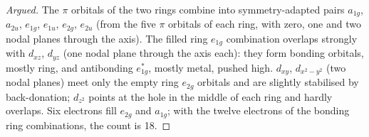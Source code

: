 \begin{proof}[Argued]
The $\pi$ orbitals of the two rings combine into symmetry-adapted pairs $a_{1g}$, $a_{2u}$,
$e_{1g}$, $e_{1u}$, $e_{2g}$, $e_{2u}$ (from the five $\pi$ orbitals of each ring, with zero, one and two
nodal planes through the axis). The filled ring $e_{1g}$ combination overlaps
strongly with $d_{xz}$, $d_{yz}$ (one nodal plane through the axis each): they form bonding
orbitals, mostly ring, and antibonding $e_{1g}^\ast$, mostly metal, pushed high. $d_{xy}$, $d_{x^2-y^2}$
(two nodal planes) meet only the empty ring $e_{2g}$ orbitals and are slightly
stabilised by back-donation; $d_{z^2}$ points at the hole in the middle of each ring and
hardly overlaps. Six electrons fill $e_{2g}$ and $a_{1g}$; with the twelve electrons of the
bonding ring combinations, the count is 18.
\end{proof}

